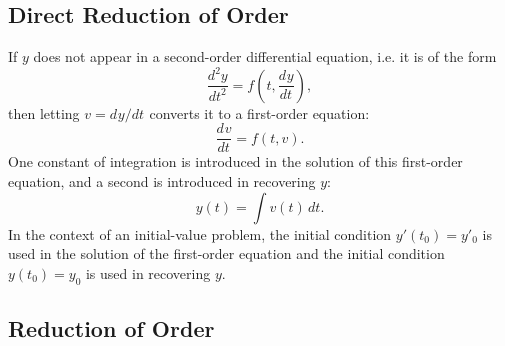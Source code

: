 \documentclass{myart}
\newcommand{\deriv}[3][]{\frac{d^{#1}#2}{d#3^{#1}}}
\newcommand{\fderiv}[3][]{d^{#1}#2/d#3^{#1}}
\begin{document}
\subsection{Direct Reduction of Order}
\label{subsec:direct reduction}

If $y$ does not appear in a second-order differential equation, i.e.
it is of the form
\begin{equation*}
  \deriv[2]{y}{t} = f\left(t, \deriv{y}{t}\right),
\end{equation*}
then letting $v = \fderiv{y}{t}$ converts it to a first-order
equation:
\begin{equation*}
  \deriv{v}{t} = f(t, v).
\end{equation*}
One constant of integration is introduced in the solution of this
first-order equation, and a second is introduced in recovering $y$:
\begin{equation*}
  y(t) = \int v(t) \,dt.
\end{equation*}
In the context of an initial-value problem, the initial condition
$y'(t_0) = y'_0$ is used in the solution of the first-order equation
and the initial condition $y(t_0) = y_0$ is used in recovering $y$.

\subsection{Reduction of Order}
\label{subsec:reduction of order}
\end{document}
